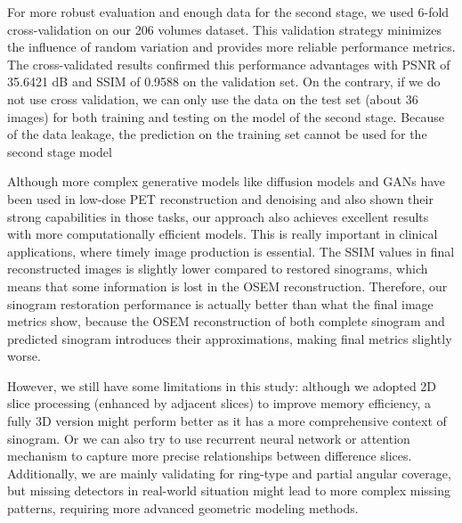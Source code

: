 \documentclass[12pt]{iopart}
\begin{document}
For more robust evaluation and enough data for the second stage, we used 6-fold cross-validation on our 206 volumes dataset. 
This validation strategy minimizes the influence of random variation and provides more reliable performance metrics. The cross-validated results confirmed this performance advantages with PSNR of 35.6421 dB and SSIM of 0.9588 on the validation set. 
On the contrary, if we do not use cross validation, we can only use the data on the test set (about 36 images) for both training and testing on the model of the second stage. Because of the data leakage, the prediction on the training set cannot be used for the second stage model 

Although more complex generative models like diffusion models and GANs have been used in low-dose PET reconstruction and denoising and also shown their strong capabilities in those tasks, our approach also achieves excellent results with more computationally efficient models. This is really important in clinical applications, where timely image production is essential.
The SSIM values in final reconstructed images is slightly lower compared to restored sinograms, which means that some information is lost in the OSEM reconstruction. 
Therefore, our sinogram restoration performance is actually better than what the final image metrics show, because the OSEM reconstruction of both complete sinogram and predicted sinogram introduces their approximations, making final metrics slightly worse.




However, we still have some limitations in this study: although we adopted 2D slice processing (enhanced by adjacent slices) to improve memory efficiency, a fully 3D version might perform better as it has a more comprehensive context of sinogram. Or we can also try to use recurrent neural network or attention mechanism to capture more precise relationships between difference slices. 
Additionally, we are mainly validating for ring-type and partial angular coverage, but missing detectors in real-world situation might lead to more complex missing patterns, requiring more advanced geometric modeling methods.
\end{document}
